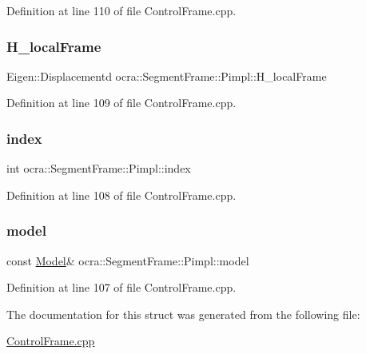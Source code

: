 Definition at line 110 of file Control\+Frame.\+cpp.

\hypertarget{structocra_1_1SegmentFrame_1_1Pimpl_a5e0d767dc540fbd56b1e6f125ba7abf6}{}\label{structocra_1_1SegmentFrame_1_1Pimpl_a5e0d767dc540fbd56b1e6f125ba7abf6} 
\subsubsection{\texorpdfstring{H\+\_\+local\+Frame}{H\_localFrame}}
{\footnotesize\ttfamily Eigen\+::\+Displacementd ocra\+::\+Segment\+Frame\+::\+Pimpl\+::\+H\+\_\+local\+Frame}



Definition at line 109 of file Control\+Frame.\+cpp.

\hypertarget{structocra_1_1SegmentFrame_1_1Pimpl_aeeadbd2b42d3e0cf750cbc0df50f213c}{}\label{structocra_1_1SegmentFrame_1_1Pimpl_aeeadbd2b42d3e0cf750cbc0df50f213c} 
\subsubsection{\texorpdfstring{index}{index}}
{\footnotesize\ttfamily int ocra\+::\+Segment\+Frame\+::\+Pimpl\+::index}



Definition at line 108 of file Control\+Frame.\+cpp.

\hypertarget{structocra_1_1SegmentFrame_1_1Pimpl_a787a1cc368ab12229ecd11358e2805e1}{}\label{structocra_1_1SegmentFrame_1_1Pimpl_a787a1cc368ab12229ecd11358e2805e1} 
\subsubsection{\texorpdfstring{model}{model}}
{\footnotesize\ttfamily const \hyperlink{classocra_1_1Model}{Model}\& ocra\+::\+Segment\+Frame\+::\+Pimpl\+::model}



Definition at line 107 of file Control\+Frame.\+cpp.



The documentation for this struct was generated from the following file\+:\begin{DoxyCompactItemize}
\item 
\hyperlink{ControlFrame_8cpp}{Control\+Frame.\+cpp}\end{DoxyCompactItemize}

